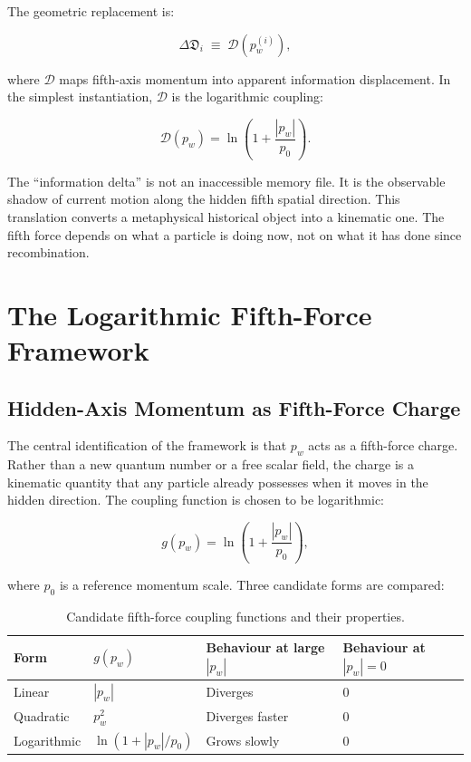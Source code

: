 \documentclass[11pt,a4paper]{article}
\newcommand{\pw}{p_w}                        %
\newcommand{\InfoD}{\Delta\mathfrak{D}}      %
\begin{document}
The geometric replacement is:

\[
  \InfoD_i \;\equiv\; \mathcal{D}(\pw^{(i)}) ,
\]

where $\mathcal{D}$ maps fifth-axis momentum into apparent information
displacement.  In the simplest instantiation, $\mathcal{D}$ is the
logarithmic coupling:

\[
  \mathcal{D}(\pw) = \ln\!\left(1 + \frac{|\pw|}{p_0}\right) .
\]

The ``information delta'' is not an inaccessible memory file.  It is the
observable shadow of current motion along the hidden fifth spatial direction.
This translation converts a metaphysical historical object into a kinematic
one.  The fifth force depends on what a particle is doing now, not on what
it has done since recombination.


\section{The Logarithmic Fifth-Force Framework}\label{sec:framework}

\subsection{Hidden-Axis Momentum as Fifth-Force Charge}\label{sec:charge}

The central identification of the framework is that $\pw$ acts as a fifth-force
charge.  Rather than a new quantum number or a free scalar field, the charge is
a kinematic quantity that any particle already possesses when it moves in the
hidden direction.  The coupling function is chosen to be logarithmic:

\[
  g(\pw) = \ln\!\left(1 + \frac{|\pw|}{p_0}\right) ,
\]

where $p_0$ is a reference momentum scale.  Three candidate forms are
compared:

\begin{table}[H]
\centering
\caption{Candidate fifth-force coupling functions and their properties.}
\begin{tabular}{@{}llll@{}}
\toprule
Form & $g(\pw)$ & Behaviour at large $|\pw|$ & Behaviour at $|\pw|=0$ \\
\midrule
Linear    & $|\pw|$ & Diverges & $0$ \\
Quadratic & $\pw^2$ & Diverges faster & $0$ \\
Logarithmic & $\ln(1+|\pw|/p_0)$ & Grows slowly & $0$ \\
\bottomrule
\end{tabular}
\end{table}
\end{document}
